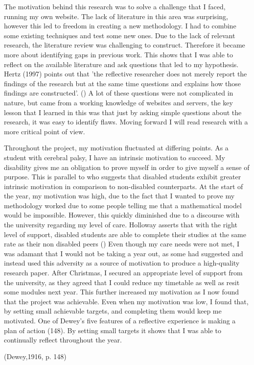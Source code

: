 

The motivation behind this research was to solve a challenge that I faced, running my own website. The lack of literature in this area was surprising, however this led to freedom in creating a new methodology. I had to combine some existing techniques and test some new ones. Due to the lack of relevant research, the literature review was challenging to construct. Therefore it became more about identifying gaps in previous work. This shows that I was able to reflect on the available literature and ask questions that led to my hypothesis. Hertz (1997) points out that 'the reflective researcher does not merely report the findings of the research but at the same time questions and explains how those findings are constructed'. (\cite{hertz1996introduction}) A lot of these questions were not complicated in nature, but came from a working knowledge of websites and servers, the key lesson that I learned in this was that just by asking simple questions about the research, it was easy to identify flaws. Moving forward I will read research with a more critical point of view.

Throughout the project, my motivation fluctuated at differing points. As a student with cerebral palsy, I have an intrinsic motivation to succeed. My disability gives  me an obligation to prove myself in order to give myself a sense of purpose. This is parallel to \cite{bye2007motivation} who suggests that disabled students exhibit greater intrinsic motivation in comparison to non-disabled counterparts. At the start of the year, my motivation was high, due to the fact that I wanted to prove my methodology worked due to some people telling me that a mathematical model would be impossible. However, this quickly diminished due to a discourse with the university regarding my level of care. Holloway asserts that with the right level of support, disabled students are able to complete their studies at the same rate as their non disabled peers (\cite{holloway2001experience}) Even though my care needs were not met, I was adamant that I would not be taking a year out, as some had suggested and instead used this adversity as a source of motivation to produce a high-quality research paper. After Christmas, I secured an appropriate level of support from the university, as they agreed that I could reduce my timetable as well as resit some modules next year. This further increased my motivation as I now found that the project was achievable. Even when my motivation was low, I found that, by setting small achievable targets, and completing them would keep me motivated. One of Dewey's five features of a reflective experience is making a plan of action (\cite{dewey_1917}148). By setting small targets it shows that I was able to continually reflect throughout the year.



(Dewey,1916, p. 148) 